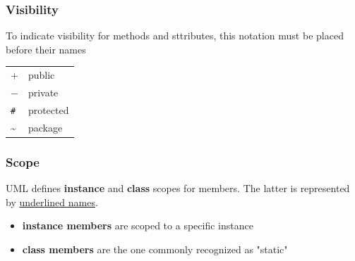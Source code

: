     \subsubsection{Visibility}
    To indicate visibility for methods and sttributes, this notation 
    must be placed before their names
    \begin{table}[ht]
        \begin{tabular}{l l}
            $+$ \quad \quad & public\\
            $-$ & private\\
            \texttt{\#} & protected\\
            \textasciitilde & package\\
        \end{tabular}
    \end{table}
    \subsubsection{Scope}
    UML defines \textbf{instance} and \textbf{class} scopes for members. 
    The latter is represented by \underline{underlined names}.
    \begin{itemize}
        \item \textbf{instance members} are scoped to a specific instance
        \item \textbf{class members} are the one commonly recognized as 
        "static"
    \end{itemize}
